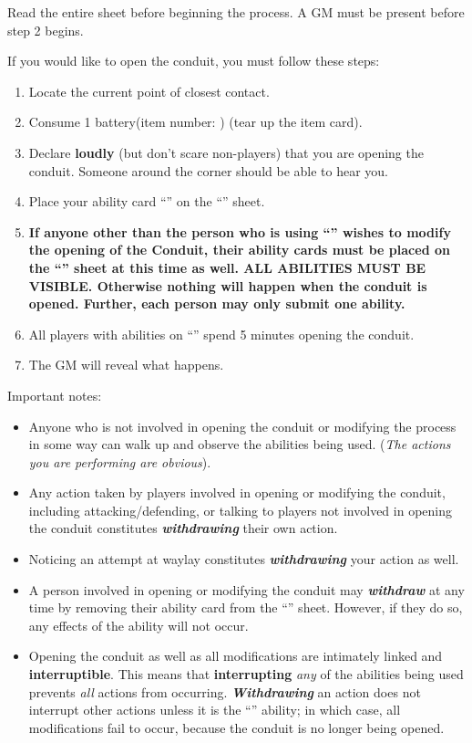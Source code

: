 \documentclass[green]{elementals}
\begin{document}
\name{\gConduit{}}

Read the entire sheet before beginning the process. A GM must be present before step 2 begins.


If you would like to open the conduit, you must follow these steps:
\begin{enumerate}
  \item Locate the current point of closest contact.
  \item Consume 1 battery(item number: \iBattery{\MYnumber{}}) (tear up the item card).
  \item Declare {\bf loudly} (but don't scare non-players) that you are opening the conduit. Someone around the corner should be able to hear you.
  \item Place your ability card ``\aWorkConduit{}'' on the ``\gConduitModifier{}'' sheet.
  \item {\bf If anyone other than the person who is using ``\aWorkConduit{}'' wishes to modify the opening of the Conduit, their ability cards must be placed on the ``\gConduitModifier{}'' sheet at this time as well. ALL ABILITIES MUST BE VISIBLE. Otherwise nothing will happen when the conduit is opened. Further, each person may only submit {\bf one} ability.}
  \item All players with abilities on ``\gConduitModifier{}'' spend 5 minutes opening the conduit.
  \item The GM will reveal what happens.
\end{enumerate}

Important notes:
\begin{itemize}
  \item Anyone who is not involved in opening the conduit or modifying the process in some way can walk up and observe the abilities being used. (\emph{The actions you are performing are obvious}).
  \item Any action taken by players involved in opening or modifying the conduit, including attacking/defending, or talking to players not involved in opening the conduit constitutes {\bf \emph{withdrawing}} their own action.
  \item Noticing an attempt at waylay constitutes {\bf \emph{withdrawing}} your action as well.
  \item A person involved in opening or modifying the conduit may {\bf \emph{withdraw}} at any time by removing their ability card from the ``\gConduitModifier{}'' sheet. However, if they do so, any effects of the ability will not occur.
  \item Opening the conduit as well as all modifications are intimately linked and {\bf interruptible}. This means that {\bf interrupting} \emph{any} of the abilities being used prevents \emph{all} actions from occurring. {\bf \emph{Withdrawing}} an action does not interrupt other actions unless it is the ``\aWorkConduit{}'' ability; in which case, all modifications fail to occur, because the conduit is no longer being opened.
\end{itemize}
\end{document}
